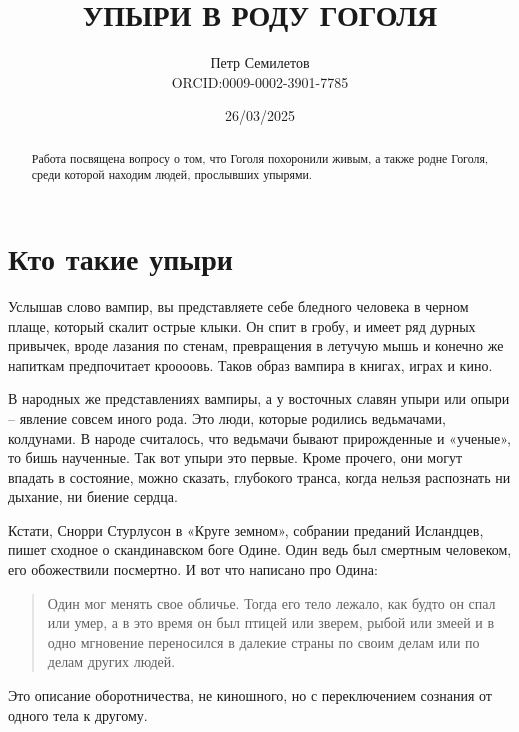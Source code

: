 \documentclass[a5paper,11pt,openany]{article}
\title{УПЫРИ В РОДУ ГОГОЛЯ\\
\textsmaller[2]{редакция 1.0}}
\author{Петр Семилетов\\ORCID:0009-0002-3901-7785 \orcidlink{0009-0002-3901-7785}}
\date{26/03/2025}
\begin{document}
\maketitle

\pagestyle{empty}


\newpage

\pagestyle{plain}



%
%
%

\begin{abstract}
Работа посвящена вопросу о том, что Гоголя похоронили живым, а также родне Гоголя, среди которой находим людей, прослывших упырями.
\end{abstract}


\section{Кто такие упыри}

   Услышав слово вампир, вы представляете себе бледного человека в черном плаще, который скалит острые клыки. Он спит в гробу, и имеет ряд дурных привычек, вроде лазания по стенам, превращения в летучую мышь и конечно же напиткам предпочитает кроооовь. Таков образ вампира в книгах, играх и кино.

   В народных же представлениях вампиры, а у восточных славян упыри или опыри – явление совсем иного рода. Это люди, которые родились ведьмачами, колдунами. В народе считалось, что ведьмачи бывают прирожденные и «ученые», то бишь наученные. Так вот упыри это первые. Кроме прочего, они могут впадать в состояние, можно сказать, глубокого транса, когда нельзя распознать ни дыхание, ни биение сердца. 

   Кстати, Снорри Стурлусон в «Круге земном», собрании преданий Исландцев, пишет сходное о скандинавском боге Одине. Один ведь был смертным человеком, его обожествили посмертно. И вот что написано про Одина:

\begin{quotation}
\noindent Один мог менять свое обличье. Тогда его тело лежало, как будто он спал или умер, а в
это время он был птицей или зверем, рыбой
или змеей и в одно мгновение переносился в
далекие страны по своим делам или по делам
других людей.
\end{quotation}

Это описание оборотничества, не киношного, но с переключением сознания от одного тела к другому. 
\end{document}
